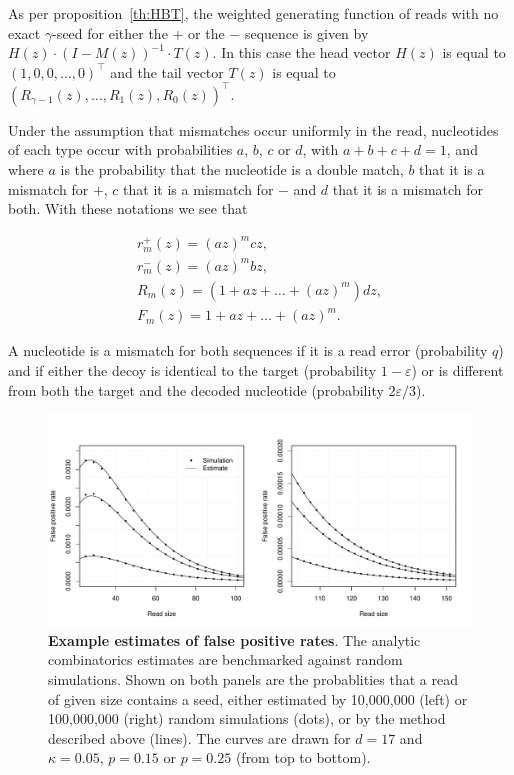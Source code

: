 \documentclass{article}
\begin{document}
As per proposition~\ref{th:HBT}, the weighted generating function of reads
with no exact $\gamma$-seed for either the $+$ or the $-$ sequence is
given by $H(z) \cdot (I-M(z))^{-1} \cdot T(z)$. In this case the head
vector $H(z)$ is equal to $(1,0,0,\ldots,0)^\top$ and the tail vector
$T(z)$ is equal to $(R_{\gamma-1}(z), \ldots, R_1(z), R_0(z))^\top$.

Under the assumption that mismatches occur uniformly in the read,
nucleotides of each type occur with probabilities $a$, $b$, $c$ or $d$,
with $a+b+c+d=1$, and where $a$ is the probability that the nucleotide is
a double match, $b$ that it is a mismatch for $+$, $c$ that it is a
mismatch for $-$ and $d$ that it is a mismatch for both. With these
notations we see that

\begin{gather*}
r_m^+(z) = (az)^mcz, \\
r_m^-(z) = (az)^mbz, \\
R_m(z) = (1 + az + \ldots + (az)^m)dz, \\
F_m(z) = 1 + az + \ldots + (az)^m.
\end{gather*}

A nucleotide is a mismatch for both sequences if it is a read error
(probability $q$) and if either the decoy is identical to the target
(probability $1-\varepsilon$) or is different from both the target and the
decoded nucleotide (probability $2\varepsilon/3$).

\begin{figure}[h]
\centering
\includegraphics[scale=0.445]{simulp_false_positives.pdf}
\caption{\textbf{Example estimates of false positive rates}. The analytic
combinatorics estimates are benchmarked against random simulations. Shown
on both panels are the probablities that a read of given size contains a
seed, either estimated by 10,000,000 (left) or 100,000,000 (right) random
simulations (dots), or by the method described above (lines). The curves
are drawn for $d=17$ and $\kappa=0.05$, $p=0.15$ or $p=0.25$ (from top to
bottom).}
\label{fig:simulp_fp}
\end{figure}
\end{document}
